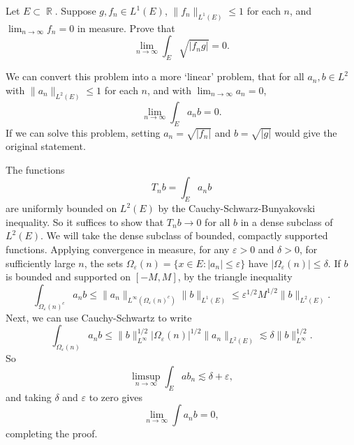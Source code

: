 \documentclass[answers]{exam}
\DeclareMathOperator{\RR}{\mathbb{R}}
\begin{document}
\begin{questions}

\question Let $E \subset \RR$. Suppose $g,f_n \in L^1(E)$, $\| f_n \|_{L^1(E)} \leq 1$ for each $n$, and $\lim_{n \to \infty} f_n = 0$ in measure. Prove that
%
\[ \lim_{n \to \infty} \int_E \sqrt{|f_n g|} = 0. \]
\begin{solution}
	We can convert this problem into a more `linear' problem, that for all $a_n, b \in L^2$ with $\| a_n \|_{L^2(E)} \leq 1$ for each $n$, and with $\lim_{n \to \infty} a_n = 0$,
	\[ \lim_{n \to \infty} \int_E a_n b = 0. \]
	If we can solve this problem, setting $a_n = \sqrt{|f_n|}$ and $b = \sqrt{|g|}$ would give the original statement.

	The functions
	\[ T_n b = \int_E a_n b \]
	are uniformly bounded on $L^2(E)$ by the Cauchy-Schwarz-Bunyakovski inequality. So it suffices to show that $T_n b \to 0$ for all $b$ in a dense subclass of $L^2(E)$. We will take the dense subclass of bounded, compactly supported functions. Applying convergence in measure, for any $\varepsilon > 0$ and $\delta > 0$, for sufficiently large $n$, the sets $\Omega_\varepsilon(n) = \{ x \in E : |a_n| \leq \varepsilon \}$ have $|\Omega_\varepsilon(n)| \leq \delta$. If $b$ is bounded and supported on $[-M,M]$, by the triangle inequality
	\[ \int_{\Omega_\varepsilon(n)^c} a_n b \leq \| a_n \|_{L^\infty(\Omega_\varepsilon(n)^c)} \| b \|_{L^1(E)} \leq \varepsilon^{1/2} M^{1/2} \| b \|_{L^2(E)}. \]
	Next, we can use Cauchy-Schwartz to write
	\[ \int_{\Omega_\varepsilon(n)} a_n b \leq \| b \|_{L^\infty}^{1/2} |\Omega_\varepsilon(n)|^{1/2} \| a_n \|_{L^2(E)} \lesssim \delta \| b \|_{L^\infty}^{1/2}. \]
	So
	\[ \limsup_{n \to \infty} \int_E ab_n \lesssim \delta + \varepsilon, \]
	and taking $\delta$ and $\varepsilon$ to zero gives
	\[ \lim_{n \to \infty} \int a_n b = 0, \]
	completing the proof.
\end{solution}


\end{questions}
\end{document}
